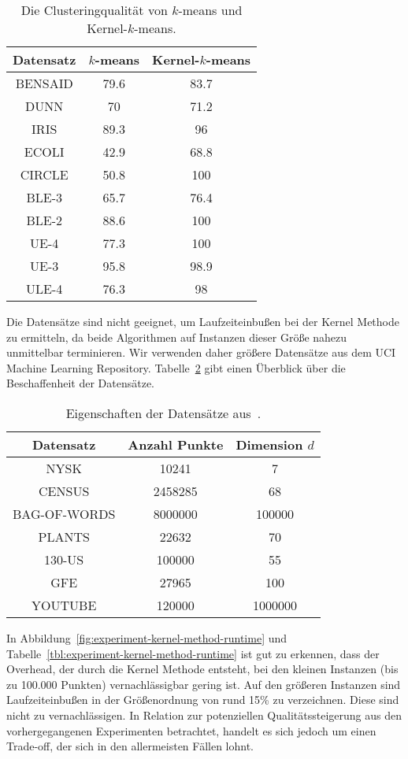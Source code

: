 \begin{table}[t]
\centering
\begin{tabular}{@{}ccc@{}} \toprule
	\textbf{Datensatz} & \textbf{$k$-means} & \textbf{Kernel-$k$-means} \\ \midrule
	BENSAID & 79.6 & 83.7 \\
	DUNN & 70 & 71.2 \\
	IRIS & 89.3 & 96 \\
	ECOLI & 42.9 & 68.8 \\
	CIRCLE & 50.8 & 100 \\
	BLE-3 & 65.7 & 76.4 \\
	BLE-2 & 88.6 & 100 \\
	UE-4 & 77.3 & 100 \\
	UE-3 & 95.8 & 98.9 \\
	ULE-4 & 76.3 & 98 \\ \bottomrule
\end{tabular}
\caption{Die Clusteringqualität von $k$-means und Kernel-$k$-means.}
\label{tbl:experiment-kernel-method-quality}
\end{table}
\absatz
Die Datensätze sind nicht geeignet, um Laufzeiteinbußen bei der Kernel Methode zu ermitteln, da beide Algorithmen auf Instanzen
dieser Größe nahezu unmittelbar terminieren. Wir verwenden daher größere Datensätze aus dem UCI Machine Learning Repository.
Tabelle~\ref{tbl:experiment-kernel-method-runtime-datasets} gibt einen Überblick über die Beschaffenheit der Datensätze.

\begin{table}[h]
\centering
\begin{tabular}{@{}ccc@{}} \toprule
	\textbf{Datensatz} & \textbf{Anzahl Punkte} & \textbf{Dimension} $d$ \\ \midrule
	NYSK & 10241 & 7 \\
	CENSUS & 2458285  & 68 \\
	BAG-OF-WORDS & 8000000 & 100000 \\
	PLANTS & 22632 & 70 \\
	130-US & 100000 & 55 \\
	GFE & 27965 & 100 \\
	YOUTUBE & 120000 & 1000000 \\ \bottomrule
\end{tabular}
\caption{Eigenschaften der Datensätze aus~\cite{Lichman13}.}
\label{tbl:experiment-kernel-method-runtime-datasets}
\end{table}
In Abbildung~\ref{fig:experiment-kernel-method-runtime} und Tabelle~\ref{tbl:experiment-kernel-method-runtime} ist gut zu
erkennen, dass der Overhead, der durch die Kernel Methode entsteht, bei den kleinen Instanzen (bis zu 100.000 Punkten)
vernachlässigbar gering ist. Auf den größeren Instanzen sind Laufzeiteinbußen in der Größenordnung von rund 15\% zu verzeichnen.
Diese sind nicht zu vernachlässigen. In Relation zur potenziellen Qualitätssteigerung aus den vorhergegangenen Experimenten
betrachtet, handelt es sich jedoch um einen Trade-off, der sich in den allermeisten Fällen lohnt.

